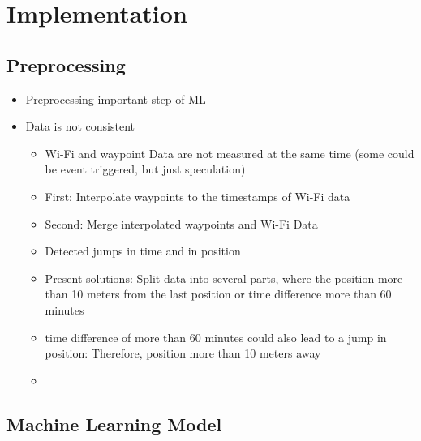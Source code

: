 \chapter{Implementation}

\section{Preprocessing}
    \begin{itemize}
        \item Preprocessing important step of ML
        \item Data is not consistent
        \begin{itemize}
            \item Wi-Fi and waypoint Data are not measured at the same time (some could be event triggered, but just speculation)
            \item First: Interpolate waypoints to the timestamps of Wi-Fi data
            \item Second: Merge interpolated waypoints and Wi-Fi Data
            \item Detected jumps in time and in position
            \item Present solutions: Split data into several parts, where the position more than 10 meters from the last position or time difference more than 60 minutes
            \item time difference of more than 60 minutes could also lead to a jump in position: Therefore, position more than 10 meters away
            \item 
        \end{itemize}
    \end{itemize}

\section{Machine Learning Model}


